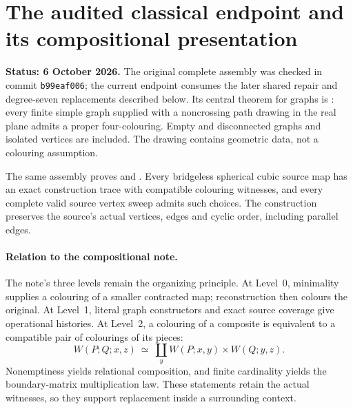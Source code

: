 \section{The audited classical endpoint and its compositional presentation}
\label{sec:complete-compositional-plan}

\textbf{Status: 6 October 2026.}
The original complete assembly was checked in commit \texttt{b99eaf006};
the current endpoint consumes the later shared repair and degree-seven
replacements described below.
Its central theorem for graphs is
:
every finite simple graph supplied with a noncrossing path drawing in the
real plane admits a proper four-colouring. Empty and disconnected graphs
and isolated vertices are included. The drawing contains geometric data,
not a colouring assumption.

The same assembly proves
and .
Every bridgeless spherical cubic source map has an exact construction trace
with compatible colouring witnesses, and every complete valid source vertex
sweep admits such choices. The construction preserves the source's actual
vertices, edges and cyclic order, including parallel edges.

\paragraph{Relation to the compositional note.}
The note's three levels remain the organizing principle. At Level~0,
minimality supplies a colouring of a smaller contracted map; reconstruction
then colours the original. At Level~1, literal graph constructors and exact
source coverage give operational histories. At Level~2, a colouring of a
composite is equivalent to a compatible pair of colourings of its pieces:
\[
 W(P;Q;x,z)\ \simeq\ \coprod_y W(P;x,y)\times W(Q;y,z).
\]
Nonemptiness yields relational composition, and finite cardinality yields
the boundary-matrix multiplication law. These statements retain the actual
witnesses, so they support replacement inside a surrounding context.

